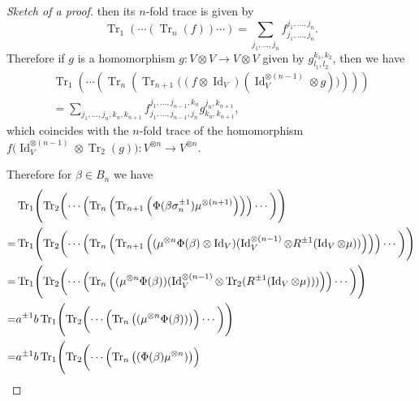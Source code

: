 \documentclass{amsart}
\newcommand{\Id}{\operatorname{Id}}
\newcommand{\Tr}{\operatorname{Tr}}
\theoremstyle{definition}
\theoremstyle{remark}
\numberwithin{equation}{section}
\begin{document}
\begin{proof}[Sketch of a proof]
then its $n$-fold trace is given by
\begin{equation*}
  \Tr_1(\cdots(\Tr_{n}(f))\cdots)
  =
  \sum_{j_1,\dots,j_n}f_{j_1,\dots,j_n}^{j_1,\dots,j_n}.
\end{equation*}
Therefore if $g$ is a homomorphism $g\colon V\otimes V\to V\otimes V$ given by $g_{l_1,l_2}^{k_1,k_2}$, then we have
\begin{multline*}
  \Tr_1
  \left(\cdots
    \left(\Tr_n
      \left(\Tr_{n+1}
        \bigl(
          (f\otimes\Id_V)(\Id_V^{\otimes(n-1)}\otimes g)
        \bigr)
      \right)
    \right)
  \right)
  \\
  =
  \sum_{j_1,\dots,j_n,k_n,k_{n+1}}
  f_{j_1,\dots,j_{n-1},j_n}^{j_1,\dots,j_{n-1},k_n}
  g_{k_n,k_{n+1}}^{j_n,k_{n+1}},
\end{multline*}
which coincides with the $n$-fold trace of the homomorphism $f\bigl(\Id_V^{\otimes(n-1)}\otimes\Tr_2(g)\bigr)\colon V^{\otimes n}\to V^{\otimes n}$.
\par
Therefore for $\beta\in B_n$ we have
\begin{equation*}
\begin{split}
  &\Tr_1
  \Biggl(
    \Tr_2
    \biggl(
      \cdots
      \Bigl(
        \Tr_n
        \left(
          \Tr_{n+1}\left(\Phi(\beta\sigma_n^{\pm1})\mu^{\otimes(n+1)}\right)
        \right)
      \Bigr)
      \cdots
    \biggr)
  \Biggr)
  \\
  =&
  \Tr_1
  \Biggl(
    \Tr_2
    \biggl(
      \cdots
      \Bigl(
        \Tr_n
        \left(
          \Tr_{n+1}
          \left(
            (\mu^{\otimes n}\Phi(\beta)\otimes\Id_V)
            (\Id_V^{\otimes(n-1)}\otimes R^{\pm1}(\Id_V\otimes\mu))
          \right)
        \right)
      \Bigr)
      \cdots
    \biggr)
  \Biggr)
  \\
  =&
  \Tr_1
  \Biggl(
    \Tr_2
    \biggl(
      \cdots
      \Bigl(
        \Tr_n
        \left(
            (\mu^{\otimes n}\Phi(\beta))
            (\Id_V^{\otimes(n-1)}\otimes\Tr_2(R^{\pm1}(\Id_V\otimes\mu)))
        \right)
      \Bigr)
      \cdots
    \biggr)
  \Biggr)
  \\
  =&
  a^{\pm1}b
  \Tr_1
  \Biggl(
    \Tr_2
    \biggl(
      \cdots
      \Bigl(
        \Tr_n
        \left(
            (\mu^{\otimes n}\Phi(\beta))
        \right)
      \Bigr)
      \cdots
    \biggr)
  \Biggr)
  \\
  =&
  a^{\pm1}b
  \Tr_1
  \Biggl(
    \Tr_2
    \biggl(
      \cdots
      \Bigl(
        \Tr_n
        \left(
            (\Phi(\beta)\mu^{\otimes n})
        \right)
      \Bigr)

\end{split}
\end{equation*}
\end{proof}
\end{document}
